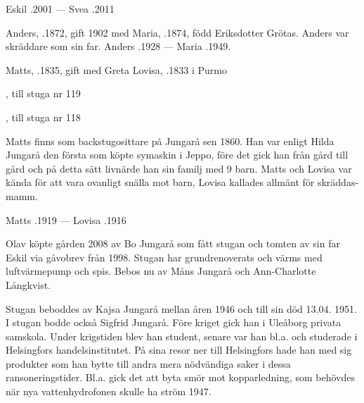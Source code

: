 Eskil .2001  ---  Svea .2011





Anders, .1872, gift 1902 med Maria, .1874, född Eriksdotter Grötas. Anders var skräddare som sin far. Anders .1928  ---   Maria .1949.\jhvspace{}


Matts, .1835, gift med Greta Lovisa, .1833 i Purmo
\begin{jhchildren}
  \item {}
  \item {}
  \item {}
  \item {}
  \item {}
  \item {}
  \item {}, till stuga nr 119
  \item {}, till stuga nr 118
  \item {}
\end{jhchildren}
Matts finns som backstugosittare på Jungarå sen 1860. Han var enligt Hilda Jungarå den första som köpte symaskin i Jeppo, före det gick han från gård till gård och på detta sätt livnärde han sin familj med 9 barn. Matts och Lovisa var kända för att vara ovanligt snälla mot barn, Lovisa kallades allmänt för skräddas-mamm.

Matts .1919  ---  Lovisa .1916




Olav köpte gården 2008 av Bo Jungarå som fått stugan och tomten av sin far Eskil via gåvobrev från 1998. Stugan har grundrenoverats och värms med luftvärmepump och spis. Bebos nu av Måns Jungarå och Ann-Charlotte Långkvist.



Stugan  beboddes av Kajsa Jungarå mellan åren 1946 och till sin död 13.04. 1951. I stugan bodde också Sigfrid Jungarå. Före kriget gick han i Uleåborg privata samskola. Under krigstiden blev han student, senare var han bl.a. och studerade i Helsingfors handelsinstitutet. På sina resor ner till Helsingfors hade han med sig produkter som han bytte till andra mera nödvändiga saker i dessa ransoneringstider. Bl.a. gick det att byta smör mot kopparledning, som behövdes när nya vattenhydrofonen skulle ha ström 1947.

